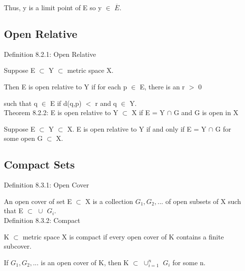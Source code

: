 	Thus, y is a limit point of E so y $\in$ $\overline{E}$.





\subsection{ Open Relative }

{ \color{blue} Definition 8.2.1: Open Relative }

	\begin{adjustbox}{minipage=14cm, right}
		Suppose E $\subset$ Y $\subset$ metric space X.

		Then E is open relative to Y if for each p $\in$ E, there is an
		r $>$ 0

		such that q $\in$ E if d(q,p) $<$ r and q $\in$ Y. \\
	\end{adjustbox}

{ \color{red} Theorem 8.2.2: E is open relative to Y $\subset$ X
if E = Y $\cap$ G and G is open in X} 

	\begin{adjustbox}{minipage=14cm, right}
		Suppose E $\subset$ Y $\subset$ X. E is open relative to Y if and
		only if E = Y $\cap$ G for some open G $\subset$ X.
	\end{adjustbox}




\subsection{ Compact Sets }

{ \color{blue} Definition 8.3.1: Open Cover } 

	\begin{adjustbox}{minipage=14cm, right, vspace=0.2cm 0cm}
		An open cover of set E $\subset$ X is a collection $G_1, G_2, ...$
		of open subsets of X such that E $\subset$ $\cup_{}^{}$ $G_i$. \\
	\end{adjustbox}

{ \color{blue} Definition 8.3.2: Compact } 

	\begin{adjustbox}{minipage=14cm, right, vspace=0.2cm 0cm}
		K $\subset$ metric space X is compact if every open cover
		of K contains a finite subcover.

		\qquad If $G_1, G_2, ...$ is an open cover of K, then
		K $\subset$ $\cup_{i=1}^{n}$ $G_i$ for some n. \\
	\end{adjustbox}

